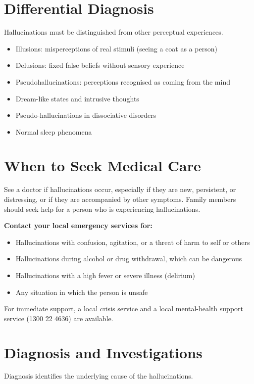 \section*{Differential Diagnosis}
Hallucinations must be distinguished from other perceptual experiences.

\begin{itemize}
    \item Illusions: misperceptions of real stimuli (seeing a coat as a person)
    \item Delusions: fixed false beliefs without sensory experience
    \item Pseudohallucinations: perceptions recognised as coming from the mind
    \item Dream-like states and intrusive thoughts
    \item Pseudo-hallucinations in dissociative disorders
    \item Normal sleep phenomena
\end{itemize}

\section*{When to Seek Medical Care}
See a doctor if hallucinations occur, especially if they are new, persistent, or distressing, or if they are accompanied by other symptoms. Family members should seek help for a person who is experiencing hallucinations.

\textbf{Contact your local emergency services for:}
\begin{itemize}
    \item Hallucinations with confusion, agitation, or a threat of harm to self or others
    \item Hallucinations during alcohol or drug withdrawal, which can be dangerous
    \item Hallucinations with a high fever or severe illness (delirium)
    \item Any situation in which the person is unsafe
\end{itemize}
For immediate support, a local crisis service and a local mental-health support service (1300 22 4636) are available.

\section*{Diagnosis and Investigations}
Diagnosis identifies the underlying cause of the hallucinations.

